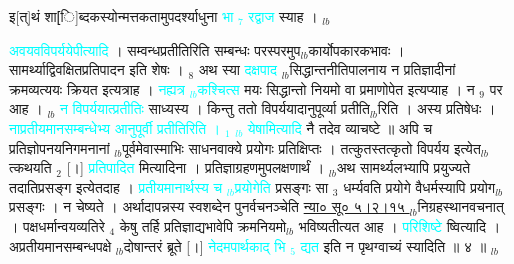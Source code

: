 \documentclass[article,12pt,a4paper]{memoir}%
\newcommand{\quotelemma}[1]{\textcolor{cyan}{#1}}
\newcounter{parCount}
\begin{document}
	  
	  \pstart \leavevmode%
	इ[त्]थं शा[ि]ब्दकस्योन्मत्तकतामुपदर्श्याधुना \quotelemma{भा {\tiny $_{7}$} रद्वाज} स्याह ।
	{}
	\pend%
      {\tiny $_{lb}$}

	  
	  \pstart \leavevmode%
	\hphantom{.}\quotelemma{अवयवविपर्ययेपीत्यादि} \cite[15a6]{vn-msN} । सम्वन्धप्रतीतिरिति सम्बन्धः परस्परमुप{\tiny $_{lb}$}कार्योपकारकभावः । सामर्थ्याद्विवक्षितप्रतिपादन इति शेषः । {\tiny $_{8}$} अथ स्या \quotelemma{दक्षपाद} {\tiny $_{lb}$}सिद्धान्तनीतिपालनाय न प्रतिज्ञादीनां क्रमव्यत्ययः क्रियत इत्यत्राह । \quotelemma{नह्यत्र {\tiny $_{lb}$}कश्चित्स} मयः \cite[15a6]{vn-msN} सिद्धान्तो नियमो वा प्रमाणोपेत इत्यप्याह । न {\tiny $_{9}$} \leavevmode{} पर आह । {\tiny $_{lb}$} \quotelemma{न विपर्ययात्प्रतीतिः} \cite[15a7]{vn-msN} साध्यस्य । किन्तु ततो विपर्ययादानुपूर्व्या प्रतीति{\tiny $_{lb}$}रिति । अस्य प्रतिषेधः । \quotelemma{नाप्रतीयमानसम्बन्धेभ्य आनुपूर्वी प्रतीतिरिति \cite[15a8]{vn-msN} । {\tiny $_{1}$} {\tiny $_{lb}$} येषामित्यादि} नै \cite[15a8]{vn-msN} तदेव व्याचष्टे ॥ अपि च प्रतिज्ञोपनयनिगमनानां {\tiny $_{lb}$}पूर्वमेवास्माभिः साधनवाक्ये प्रयोगः प्रतिक्षिप्तः । तत्कुतस्तत्कृतो विपर्यय इत्येत{\tiny $_{lb}$}त्कथयति {\tiny $_{2}$} [।] \quotelemma{प्रतिपादित} \cite[15a10]{vn-msN} मित्यादिना । प्रतिज्ञाग्रहणमुपलक्षणार्थं । {\tiny $_{lb}$}अथ सामर्थ्यलभ्यापि प्रयुज्यते तदातिप्रसङ्ग इत्येतदाह । \quotelemma{प्रतीयमानार्थस्य च {\tiny $_{lb}$}प्रयोगेति} \cite[15b1]{vn-msN} प्रसङ्गः सा {\tiny $_{3}$} धर्म्यवति प्रयोगे वैधर्मस्यापि प्रयोग{\tiny $_{lb}$}प्रसङ्गः । न चेष्यते । अर्थादापन्नस्य स्वशब्देन पुनर्वचनञ्चेति \href{http://sarit.indology.info/?cref=ns\%C5\%AB.5.2.15}{न्या० सू० ५।२।१५ } {\tiny $_{lb}$}निग्रहस्थानवचनात् । पक्षधर्मान्वयव्यतिरे {\tiny $_{4}$} केषु तर्हि प्रतिज्ञाद्यभावेपि क्रमनियमो{\tiny $_{lb}$} \leavevmode{} भविष्यतीत्यत आह । \quotelemma{परिशिष्टे} \cite[15b1]{vn-msN} ष्वित्यादि । अप्रतीयमानसम्बन्धपक्षे {\tiny $_{lb}$}दोषान्तरं ब्रूते [।] \quotelemma{नेदमपार्थकाद् भि {\tiny $_{5}$} द्यत} \cite[15b2]{vn-msN} इति न पृथग्वाच्यं स्यादिति ॥ ४ ॥
	{}
	\pend%
      {\tiny $_{lb}$}
\end{document}
